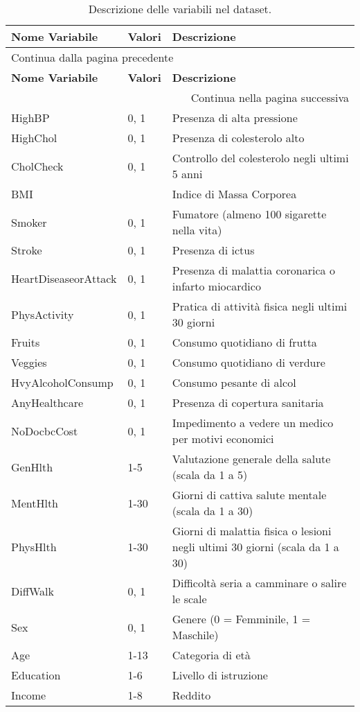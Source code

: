 \begin{longtable}{lp{2cm}p{8cm}}
  \toprule
  \textbf{Nome Variabile} & \textbf{Valori} & \textbf{Descrizione} \\
  \midrule
  \endfirsthead
  \multicolumn{3}{l}{{Continua dalla pagina precedente}} \\
  \toprule
  \textbf{Nome Variabile} & \textbf{Valori} & \textbf{Descrizione} \\
  \midrule
  \endhead
  \bottomrule
  \multicolumn{3}{r}{{Continua nella pagina successiva}} \\
  \endfoot
  \bottomrule
  \caption{Descrizione delle variabili nel dataset.}
  \endlastfoot
  HighBP & 0, 1 & Presenza di alta pressione \\
  HighChol & 0, 1 & Presenza di colesterolo alto \\
  CholCheck & 0, 1 & Controllo del colesterolo negli ultimi 5 anni \\
  BMI & & Indice di Massa Corporea \\
  Smoker & 0, 1 & Fumatore (almeno 100 sigarette nella vita) \\
  Stroke & 0, 1 & Presenza di ictus \\
  HeartDiseaseorAttack & 0, 1 & Presenza di malattia coronarica o infarto miocardico \\
  PhysActivity & 0, 1 & Pratica di attività fisica negli ultimi 30 giorni \\
  Fruits & 0, 1 & Consumo quotidiano di frutta \\
  Veggies & 0, 1 & Consumo quotidiano di verdure \\
  HvyAlcoholConsump & 0, 1 & Consumo pesante di alcol \\
  AnyHealthcare & 0, 1 & Presenza di copertura sanitaria \\
  NoDocbcCost & 0, 1 & Impedimento a vedere un medico per motivi economici \\
  GenHlth & 1-5 & Valutazione generale della salute (scala da 1 a 5) \\
  MentHlth & 1-30 & Giorni di cattiva salute mentale (scala da 1 a 30) \\
  PhysHlth & 1-30 & Giorni di malattia fisica o lesioni negli ultimi 30 giorni (scala da 1 a 30) \\
  DiffWalk & 0, 1 & Difficoltà seria a camminare o salire le scale \\
  Sex & 0, 1 & Genere (0 = Femminile, 1 = Maschile) \\
  Age & 1-13 & Categoria di età \\
  Education & 1-6 & Livello di istruzione \\
  Income & 1-8 & Reddito \\
\end{longtable}

